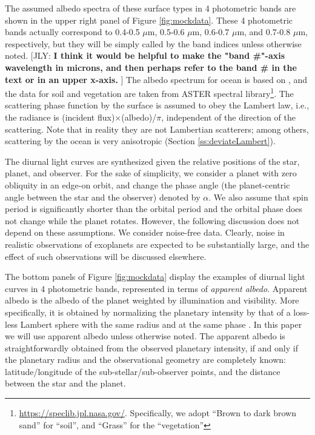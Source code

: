 \documentclass[iop,numberedappendix,apj,]{emulateapj}
\def\memoJLY#1{\color{green}[JLY: {\bf #1}]\color{black}}
\begin{document}
The assumed albedo spectra of these surface types in 4 photometric bands are shown in the upper right panel of Figure \ref{fig:mockdata}. 
These 4 photometric bands actually correspond to 0.4-0.5 $\mu $m, 0.5-0.6 $\mu $m, 0.6-0.7 $\mu $m, and 0.7-0.8 $\mu $m, respectively, but they will be simply called by the band indices unless otherwise noted. \memoJLY{I think it would be helpful to make the "band \#"-axis wavelength in microns, and then perhaps refer to the band \# in the text or in an upper x-axis. }
The albedo spectrum for ocean is based on \citet{Mclinden1997}, 
and the data for soil and vegetation are taken from ASTER spectral library\footnote{\url{https://speclib.jpl.nasa.gov/}. 
Specifically, we adopt  ``Brown to dark brown sand'' for ``soil'', and ``Grass'' for the ``vegetation''}. 
The scattering phase function by the surface is assumed to obey the Lambert law, i.e., the radiance is (incident flux)$\times $(albedo)/$\pi$, independent of the direction of the scattering. 
Note that in reality they are not Lambertian scatterers; among others,  scattering by the ocean is very anisotropic (Section \ref{ss:deviateLambert}).  


{\color{red} 
The diurnal light curves are synthesized given the relative positions of the star, planet, and observer. 
For the sake of simplicity, we consider a planet with zero obliquity in an edge-on orbit, and change the phase angle (the planet-centric angle between the star and the observer) denoted by $\alpha $. 
We also assume that spin period is significantly shorter than the orbital period and the orbital phase does not change while the planet rotates. 
However, the following discussion does not depend on these assumptions. 
We consider noise-free data. Clearly, noise in realistic observations of exoplanets are expected to be substantially large, and the effect of such observations will be discussed elsewhere.}
\color{black}

The bottom panels of Figure \ref{fig:mockdata} display the examples of diurnal light curves in 4 photometric bands, represented in terms of {\it apparent albedo}. 
Apparent albedo is the albedo of the planet weighted by illumination and visibility. 
More specifically, it is obtained by normalizing the planetary intensity by that of a loss-less Lambert sphere with the same radius and at the same phase \citep{Qiu2003, Seager2010}. 
In this paper we will use apparent albedo unless otherwise noted. 
The apparent albedo is straightforwardly obtained from the observed planetary intensity, if and only if the planetary radius and the observational geometry are completely known: latitude/longitude of the sub-stellar/sub-observer points, and the distance between the star and the planet. 
\end{document}
